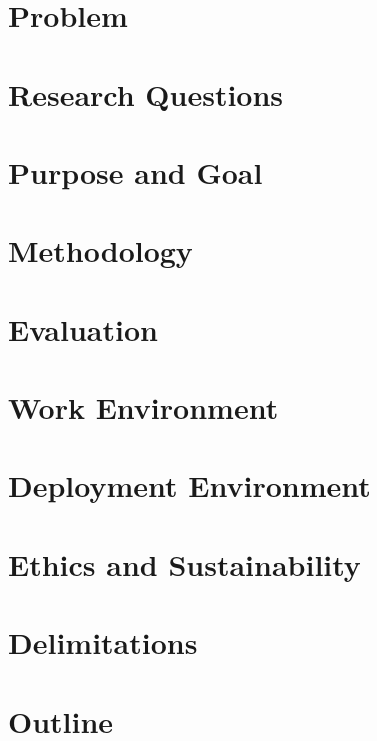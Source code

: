 \section{Problem}
\section{Research Questions}
\section{Purpose and Goal}
\section{Methodology}
\section{Evaluation}
\section{Work Environment}
\section{Deployment Environment}
\section{Ethics and Sustainability}
\section{Delimitations}
\section{Outline}
